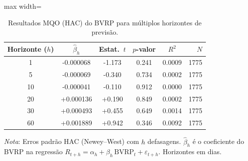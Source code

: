\begin{table}[H]
\centering
\caption{Resultados MQO (HAC) do BVRP para múltiplos horizontes de previsão.}
\label{tab:retlin-basico}
\footnotesize
\begin{adjustbox}{max width=\textwidth}
\begin{tabular}{cccccr}
\toprule
Horizonte ($h$) & $\hat{\beta}_h$ & Estat.\ $t$ & $p$-valor & $R^2$ & $N$ \\
\midrule
  1 & -0.000068 & -1.173 & 0.241 & 0.0009 & 1775 \\
  5 & -0.000069 & -0.340 & 0.734 & 0.0002 & 1775 \\
 10 & -0.000041 & -0.110 & 0.912 & 0.0000 & 1775 \\
 20 & +0.000136 & +0.190 & 0.849 & 0.0002 & 1775 \\
 30 & +0.000493 & +0.455 & 0.649 & 0.0014 & 1775 \\
 60 & +0.001889 & +0.942 & 0.346 & 0.0092 & 1775 \\
\bottomrule
\end{tabular}
\end{adjustbox}
\smallskip
\begin{minipage}{0.92\linewidth}
\footnotesize
\textit{Nota}: Erros padrão HAC (Newey--West) com $h$ defasagens. $\hat{\beta}_h$ é o coeficiente
do BVRP na regressão $R_{t+h} = \alpha_h + \beta_h\,\text{BVRP}_t + \varepsilon_{t+h}$.
Horizontes em dias.
\end{minipage}
\end{table}
